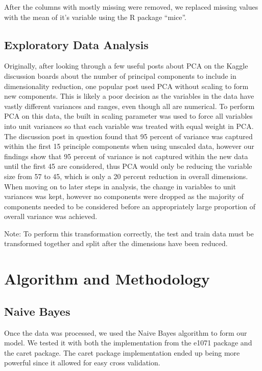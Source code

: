 \documentclass[fleqn,10pt]{SelfArx} %
\begin{document}
After the columns with mostly missing were removed, we replaced missing values with the mean of it's variable using the R package ``mice''.
\subsection{Exploratory Data Analysis}

Originally, after looking through a few useful posts about PCA on the Kaggle discussion boards about the number of principal components to include in dimensionality reduction, one popular post used PCA without scaling to form new components. This is likely a poor decision as the variables in the data have vastly different variances and ranges, even though all are numerical. To perform PCA on this data, the built in scaling parameter was used to force all variables into unit variances so that each variable was treated with equal weight in PCA. The discussion post in question found that 95 percent of variance was captured within the first 15 principle components when using unscaled data, however our findings show that 95 percent of variance is not captured within the new data until the first 45 are considered, thus PCA would only be reducing the variable size from 57 to 45, which is only a 20 percent reduction in overall dimensions. When moving on to later steps in analysis, the change in variables to unit variances was kept, however no components were dropped as the majority of components needed to be considered before an appropriately large proportion of overall variance was achieved.

Note: To perform this transformation correctly, the test and train data must be transformed together and split after the dimensions have been reduced.
\bigskip
\bigskip


\section{Algorithm and Methodology}

\subsection{Naive Bayes}
Once the data was processed, we used the Naive Bayes algorithm to form our model. We tested it with both the implementation from the e1071 package and the caret package. The caret package implementation ended up being more powerful since it allowed for easy cross validation. 
\end{document}
